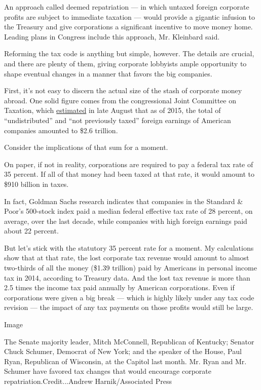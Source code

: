 An approach called deemed repatriation --- in which untaxed foreign
corporate profits are subject to immediate taxation --- would provide a
gigantic infusion to the Treasury and give corporations a significant
incentive to move money home. Leading plans in Congress include this
approach, Mr. Kleinbard said.

Reforming the tax code is anything but simple, however. The details are
crucial, and there are plenty of them, giving corporate lobbyists ample
opportunity to shape eventual changes in a manner that favors the big
companies.

First, it's not easy to discern the actual size of the stash of
corporate money abroad. One solid figure comes from the congressional
Joint Committee on Taxation, which
\href{http://waysandmeans.house.gov/wp-content/uploads/2016/09/20160831-Barthold-Letter-to-BradyNeal.pdf}{estimated}
in late August that as of 2015, the total of ``undistributed'' and ``not
previously taxed'' foreign earnings of American companies amounted to
\$2.6 trillion.

Consider the implications of that sum for a moment.

On paper, if not in reality, corporations are required to pay a federal
tax rate of 35 percent. If all of that money had been taxed at that
rate, it would amount to \$910 billion in taxes.

In fact, Goldman Sachs research indicates that companies in the Standard
\& Poor's 500-stock index paid a median federal effective tax rate of 28
percent, on average, over the last decade, while companies with high
foreign earnings paid about 22 percent.

But let's stick with the statutory 35 percent rate for a moment. My
calculations show that at that rate, the lost corporate tax revenue
would amount to almost two-thirds of all the money (\$1.39 trillion)
paid by Americans in personal income tax in 2014, according to Treasury
data. And the lost tax revenue is more than 2.5 times the income tax
paid annually by American corporations. Even if corporations were given
a big break --- which is highly likely under any tax code revision ---
the impact of any tax payments on those profits would still be large.

Image

The Senate majority leader, Mitch McConnell, Republican of Kentucky;
Senator Chuck Schumer, Democrat of New York; and the speaker of the
House, Paul Ryan, Republican of Wisconsin, at the Capitol last month.
Mr. Ryan and Mr. Schumer have favored tax changes that would encourage
corporate repatriation.Credit...Andrew Harnik/Associated Press

